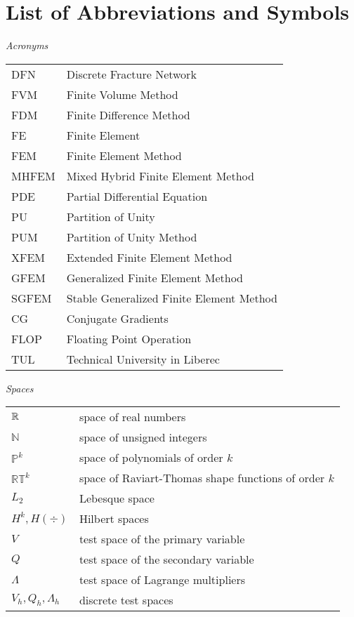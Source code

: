 \section*{List of Abbreviations and Symbols}

\noindent\emph{Acronyms}
\vspace{0.5cm}

\begin{tabularx}{\linewidth}{@{}lX@{}}
DFN & Discrete Fracture Network \\
FVM & Finite Volume Method \\
FDM & Finite Difference Method \\
FE & Finite Element \\
FEM & Finite Element Method \\
MHFEM & Mixed Hybrid Finite Element Method \\
PDE & Partial Differential Equation \\
PU & Partition of Unity \\
PUM & Partition of Unity Method \\
XFEM & Extended Finite Element Method \\
GFEM & Generalized Finite Element Method \\
SGFEM & Stable Generalized Finite Element Method \\
CG & Conjugate Gradients \\
FLOP & Floating Point Operation \\
TUL & Technical University in Liberec
\end{tabularx}
\vspace{1cm}

\noindent\emph{Spaces}
\vspace{0.5cm}

\begin{tabularx}{\linewidth}{@{}lX@{}}
$\mathbb{R}$ & space of real numbers  \\
$\mathbb N$ & space of unsigned integers \\
$\mathbb P^k$ & space of polynomials of order $k$  \\
$\mathbb {RT}^k$ & space of Raviart-Thomas shape functions of order $k$  \\
$L_2$ & Lebesque space \\
$H^k, H(\div)$ & Hilbert spaces \\
$V$ & test space of the primary variable \\
$Q$ & test space of the secondary variable \\
$\Lambda$ & test space of Lagrange multipliers\\
$V_h, Q_h, \Lambda_h$ & discrete test spaces\\
\end{tabularx}
\pagebreak

